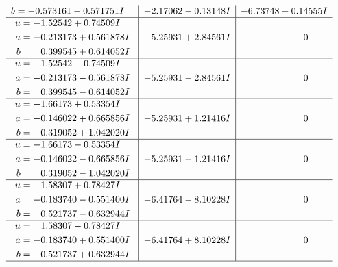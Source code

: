\documentclass[1p]{elsarticle_modified}
\theoremstyle{definition}
\begin{document}
$$\begin{array}{c|c|c}
\begin{aligned}
b &= -0.573161 - 0.571751 I\end{aligned}
 & -2.17062 - 0.13148 I & -6.73748 - 0.14555 I \\ \hline\begin{aligned}
u &= -1.52542 + 0.74509 I \\
a &= -0.213173 + 0.561878 I \\
b &= \phantom{-}0.399545 + 0.614052 I\end{aligned}
 & -5.25931 + 2.84561 I & \phantom{-0.000000 } 0 \\ \hline\begin{aligned}
u &= -1.52542 - 0.74509 I \\
a &= -0.213173 - 0.561878 I \\
b &= \phantom{-}0.399545 - 0.614052 I\end{aligned}
 & -5.25931 - 2.84561 I & \phantom{-0.000000 } 0 \\ \hline\begin{aligned}
u &= -1.66173 + 0.53354 I \\
a &= -0.146022 + 0.665856 I \\
b &= \phantom{-}0.319052 + 1.042020 I\end{aligned}
 & -5.25931 + 1.21416 I & \phantom{-0.000000 } 0 \\ \hline\begin{aligned}
u &= -1.66173 - 0.53354 I \\
a &= -0.146022 - 0.665856 I \\
b &= \phantom{-}0.319052 - 1.042020 I\end{aligned}
 & -5.25931 - 1.21416 I & \phantom{-0.000000 } 0 \\ \hline\begin{aligned}
u &= \phantom{-}1.58307 + 0.78427 I \\
a &= -0.183740 - 0.551400 I \\
b &= \phantom{-}0.521737 - 0.632944 I\end{aligned}
 & -6.41764 - 8.10228 I & \phantom{-0.000000 } 0 \\ \hline\begin{aligned}
u &= \phantom{-}1.58307 - 0.78427 I \\
a &= -0.183740 + 0.551400 I \\
b &= \phantom{-}0.521737 + 0.632944 I\end{aligned}
 & -6.41764 + 8.10228 I & \phantom{-0.000000 } 0\\
 \hline 
 \end{array}$$\newpage$$\begin{array}{c|c|c}  

\end{array}$$
\end{document}
